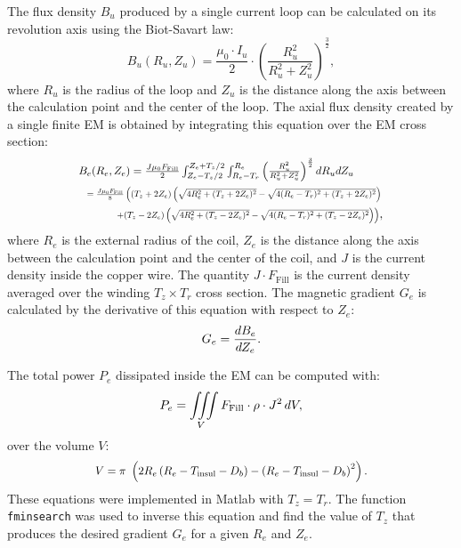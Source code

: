 The flux density $B_u$ produced by a single current loop can be calculated on its revolution axis using the Biot-Savart law:
%
\begin{equation}
B_{u}(R_u,Z_u)={\frac{\mu _0\cdot I_{u}}{2}}\cdot\left ( {\frac{R_{u}^2}{R_{u}^2+Z_u^2}} \right )^{\frac{3}{2}},
\label{bloop}
\end{equation}
%
where $R_u$ is the radius of the loop and $Z_u$ is the distance along the axis between the calculation point and the center of the loop.
The axial flux density created by a single finite EM is obtained by integrating this equation over the EM cross section:
%
\begin{align}
&\scalebox{.88}{$
B_e(R_e,Z_e) =
{\frac{J \mu _0   F_{\textrm{Fill}} }{2}} \int_{Z_e-T_z/2}^{Z_e+T_z/2} \int_{R_e-T_r}^{R_e} \left ( {\frac{R_{u}^2}{R_{u}^2+Z_u^2}} \right )^{\frac{3}{2}} \d R_u  \d Z_u 
$} \\
 &~~\scalebox{.7}{$=
  \frac{J \mu _0   F_{\textrm{Fill}}}{8}\left((T_z+2 Z_e) \left(\sqrt{4 R_e^2+(T_z+2 Z_e)^2}-\sqrt{4 (R_e-T_r)^2+(T_z+2 Z_e)^2}\right) \right. 
  $}  \nonumber \\
  & \qquad ~~~ \scalebox{.7}{$\left.+(T_z-2 Z_e) \left(\sqrt{4 R_e^2+(T_z-2 Z_e)^2}-\sqrt{4 (R_e-T_r)^2+(T_z-2 Z_e)^2}\right)\right)$} \nonumber,
\label{Be}
\end{align}
%
where $R_e$ is the external radius of the coil, $Z_e$ is the distance along the axis between the calculation point and the center of the coil, and $J$ is the current density inside the copper wire.
 The quantity $J\cdot F_{\textrm{Fill}} $ is the current density averaged over the winding $T_z \times T_r$ cross section.
  The magnetic gradient $G_e$ is calculated by the derivative of this equation with respect to $Z_e$:
\begin{equation}
G_e=\frac{d{B}_e}{d{Z}_e}.
\label{Ge}
\end{equation}

The total power $P_e$ dissipated inside the EM can be computed with:
%
\begin{equation}
P_e= \iiint\limits_V F_{\textrm{Fill}}  \cdot \rho\cdot J^2 \,d{V}, 
\label{Pe}
\end{equation}
%
over the volume $V$:
\begin{equation}
\scalebox{.9}{$V=\pi\ \left ( 2R_e \left ( R_e- T_{\textrm{insul}} -D_b \right ) -\left ( R_e-T_{\textrm{insul}}-D_b \right )^2\right ).$}
\label{V70cm}
\end{equation}
%
These equations were implemented in {\sc Matlab} with $T_z = T_r$. The function \texttt{fminsearch} was used to inverse this equation and find the value of $T_z$ that produces the desired gradient $G_e$ for a given $R_e$ and $Z_e$.

